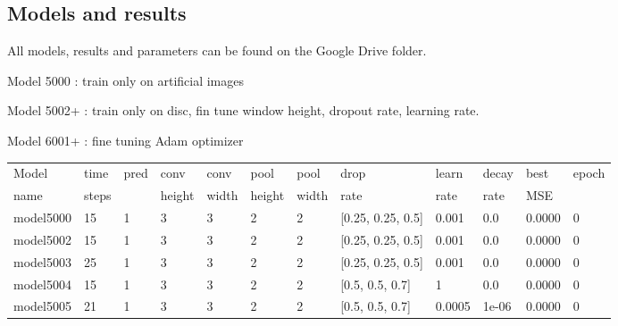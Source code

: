 \documentclass[12pt, twoside]{article}
\begin{document}
\begin{appendices}
	\subsection{Models and results}
	All models, results and parameters can be found on the Google Drive folder.
	
	Model 5000 : train only on artificial images
	
	Model 5002+ : train only on disc, fin tune window height, dropout rate, learning rate.
	
	Model 6001+ : fine tuning Adam optimizer 
	
	\begin{longtable}{|l|l|l|l|l|l|l|l|l|l|l|l|}
		\hline
		Model & time & pred & conv & conv   & pool & pool   & drop & learn & decay & best & epoch \\
		name & steps &     & height & width & height & width & rate & rate & rate & MSE & \\ \hline
		\endhead
		model5000 & 15 & 1 & 3 & 3 & 2 & 2 & [0.25, 0.25, 0.5] & 0.001 & 0.0 & 0.0000 & 0\\ \hline
		model5002 & 15 & 1 & 3 & 3 & 2 & 2 & [0.25, 0.25, 0.5] & 0.001 & 0.0 & 0.0000 & 0\\ \hline
		model5003 & 25 & 1 & 3 & 3 & 2 & 2 & [0.25, 0.25, 0.5] & 0.001 & 0.0 & 0.0000 & 0\\ \hline
		model5004 & 15 & 1 & 3 & 3 & 2 & 2 & [0.5, 0.5, 0.7] & 1 & 0.0 & 0.0000 & 0\\ \hline
		model5005 & 21 & 1 & 3 & 3 & 2 & 2 & [0.5, 0.5, 0.7] & 0.0005 & 1e-06 & 0.0000 & 0\\ \hline
	\end{longtable}
	

\end{appendices}
\end{document}
